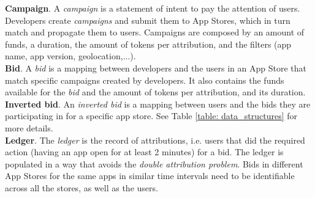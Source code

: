 \noindent \textbf{Campaign}. A \textit{campaign} is a statement of intent to pay the attention of users. Developers create \textit{campaigns} and submit them to App Stores, which in turn match and propagate them to users. Campaigns are composed by an amount of funds, a duration, the amount of tokens per attribution, and the filters (app name, app version, geolocation,...).\\

\noindent \textbf{Bid}. A \textit{bid} is a mapping between developers and the users in an App Store that match specific campaigns created by developers. It also contains the funds available for the \textit{bid} and the amount of tokens per attribution, and its duration.\\

\noindent \textbf{Inverted bid}. An \textit{inverted bid} is a mapping between users and the bids they are participating in for a specific app store. See Table \ref{table: data_structures} for more details.\\

\noindent \textbf{Ledger}. The \textit{ledger} is the record of attributions, i.e. users that did the required action (having an app open for at least 2 minutes) for a bid. The ledger is populated in a way that avoids the \textit{double attribution problem}. Bids in different App Stores for the same apps in similar time intervals need to be identifiable across all the stores, as well as the users.

